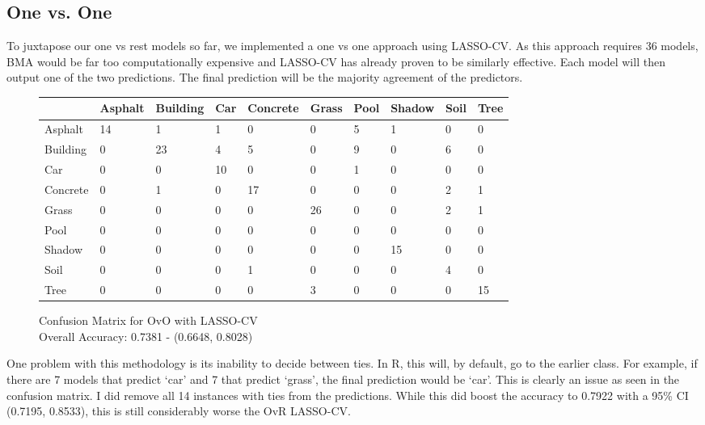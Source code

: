 \documentclass[11pt]{article}
\begin{document}
\subsection{One vs. One}
To juxtapose our one vs rest models so far, we implemented a one vs one approach using LASSO-CV.  As this approach requires 36 models, BMA would be far too computationally expensive and LASSO-CV has already proven to be similarly effective. Each model will then output one of the two predictions. The final prediction will be the majority agreement of the predictors. \\

\begin{figure}
    \centering
    \begin{tabular}{p{1.5cm} p{1.1cm} p{1.2cm} p{1cm} p{1.3cm} p{1cm} p{1 cm} p{1cm} p{1cm} p{1cm}}
      \toprule
      & Asphalt & Building & Car & Concrete & Grass & Pool & Shadow & Soil & Tree \\
      \midrule
      Asphalt & 14 & 1 & 1 & 0 & 0 & 5 & 1 & 0 & 0 \\
      Building & 0 & 23 & 4 & 5 & 0 & 9 & 0 & 6 & 0 \\
      Car & 0 & 0 & 10 & 0 & 0 & 1 & 0 & 0 & 0 \\
      Concrete & 0 & 1 & 0 & 17 & 0 & 0 & 0 & 2 & 1 \\
      Grass & 0 & 0 & 0 & 0 & 26 & 0 & 0 & 2 & 1 \\
      Pool & 0 & 0 & 0 & 0 & 0 & 0 & 0 & 0 & 0 \\
      Shadow & 0 & 0 & 0 & 0 & 0 & 0 & 15 & 0 & 0 \\
      Soil & 0 & 0 & 0 & 1 & 0 & 0 & 0 & 4 & 0 \\
      Tree & 0 & 0 & 0 & 0 & 3 & 0 & 0 & 0 & 15 \\
      \bottomrule
    \end{tabular}
    \caption{Confusion Matrix for OvO with LASSO-CV \\ Overall Accuracy: 0.7381 - (0.6648, 0.8028)}
    \label{tab:confusion_matrix}
\end{figure}%

One problem with this methodology is its inability to decide between ties. In R, this will, by default, go to the earlier class. For example, if there are 7 models that predict ‘car’ and 7 that predict ‘grass’, the final prediction would be ‘car’. This is clearly an issue as seen in the confusion matrix. I did remove all 14 instances with ties from the predictions. While this did boost the accuracy to 0.7922 with a 95\% CI (0.7195, 0.8533), this is still considerably worse the OvR LASSO-CV.
\end{document}
